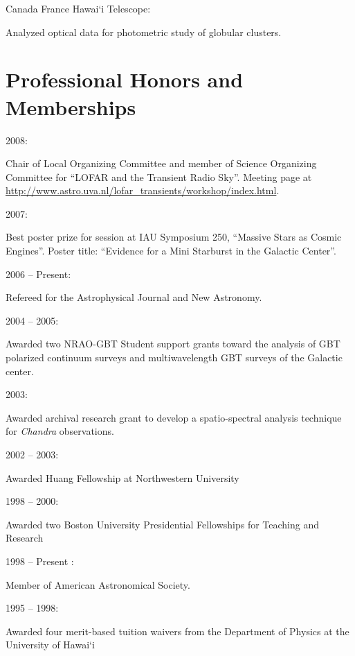 \documentclass[12pt]{article}
\begin{document}
\begin{bf}Canada France Hawai`i Telescope:  \end{bf}Analyzed optical data for photometric study of globular clusters.

\section{Professional Honors and Memberships}
\indent

\begin{bf}2008:  \end{bf}Chair of Local Organizing Committee and member of Science Organizing Committee for ``LOFAR and the Transient Radio Sky''.  Meeting page at \url{http://www.astro.uva.nl/lofar_transients/workshop/index.html}.

\begin{bf}2007:  \end{bf}Best poster prize for session at IAU Symposium 250, ``Massive Stars as Cosmic Engines''.  Poster title:  ``Evidence for a Mini Starburst in the Galactic Center''.

\begin{bf}2006 -- Present:  \end{bf} Refereed for the Astrophysical Journal and New Astronomy.

\begin{bf}2004 -- 2005:  \end{bf}Awarded two NRAO-GBT Student support grants toward the analysis of GBT polarized continuum surveys and multiwavelength GBT surveys of the Galactic center.

\begin{bf}2003:  \end{bf}Awarded archival research grant to develop a spatio-spectral analysis technique for \emph{Chandra} observations.

\begin{bf}2002 -- 2003:  \end{bf}Awarded Huang Fellowship at Northwestern University

\begin{bf}1998 -- 2000:  \end{bf}Awarded two Boston University Presidential Fellowships for Teaching and Research

\begin{bf}1998 -- Present :  \end{bf} Member of American Astronomical Society.

\begin{bf}1995 -- 1998:  \end{bf}Awarded four merit-based tuition waivers from the Department of Physics at the University of Hawai`i
\end{document}
